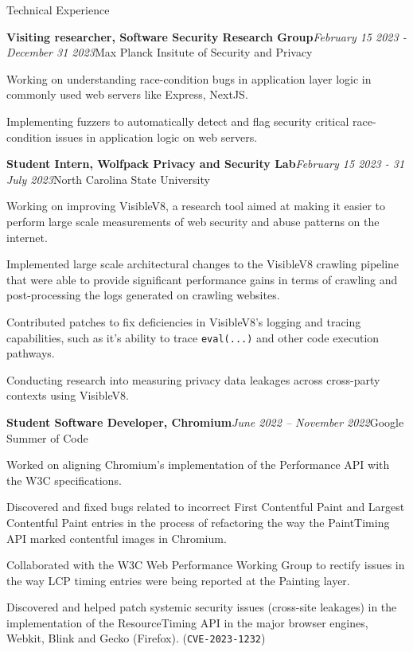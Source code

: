 \documentclass{resume} %
\begin{document}
\begin{rSection}{Technical Experience}
\begin{rSubsection}{\bf Visiting researcher, Software Security Research Group}{\em February 15 2023 - December 31 2023}{Max Planck Insitute of Security and Privacy}{}
\item Working on understanding race-condition bugs in application layer logic in commonly used web servers like Express, NextJS.
\item Implementing fuzzers to automatically detect and flag security critical race-condition issues in application logic on web servers.
\end{rSubsection}
\begin{rSubsection}{\bf Student Intern, Wolfpack Privacy and Security Lab}{\em February 15 2023 - 31 July 2023}{North Carolina State University}{}
\item Working on improving VisibleV8, a research tool aimed at making it easier to perform large scale measurements of web security and abuse patterns on the internet.
\item Implemented large scale architectural changes to the VisibleV8 crawling pipeline that were able to provide significant performance gains in terms of crawling and post-processing the logs generated on crawling websites.
\item Contributed patches to fix deficiencies in VisibleV8's logging and tracing capabilities, such as it's ability to trace \texttt{eval(...)} and other code execution pathways.
\item Conducting research into measuring privacy data leakages across cross-party contexts using VisibleV8.
\end{rSubsection}
\begin{rSubsection}{\bf Student Software Developer, Chromium}{\em June 2022 -- November 2022}{Google Summer of Code}{}
\item Worked on aligning Chromium's implementation of the Performance API with the W3C specifications.
\item Discovered and fixed bugs related to incorrect First Contentful Paint and Largest Contentful Paint entries in the process of refactoring the way the PaintTiming API marked contentful images in Chromium.
\item Collaborated with the W3C Web Performance Working Group to rectify issues in the way LCP timing entries were being reported at the Painting layer.
\item Discovered and helped patch systemic security issues (cross-site leakages) in the implementation of the ResourceTiming API in the major browser engines, Webkit, Blink and Gecko (Firefox). (\texttt{CVE-2023-1232})

\end{rSubsection}
\end{rSection}
\end{document}
